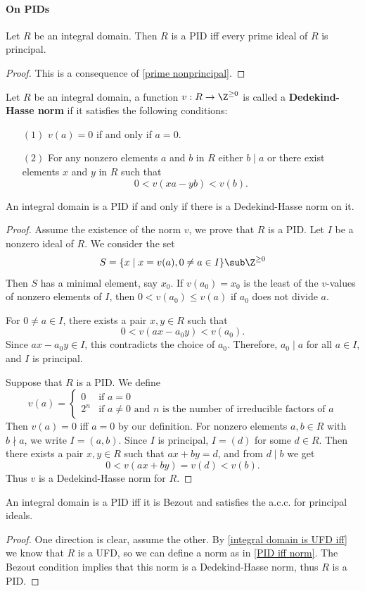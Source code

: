 \paragraph{On PIDs}
\begin{theorem}\label{PID iff prime principal}
Let $R$ be an integral domain. Then $R$ is a PID iff every prime ideal of $R$ is principal.
\end{theorem}
\begin{proof}
This is a consequence of \cref{prime nonprincipal}.
\end{proof}
\begin{definition}
Let $R$ be an integral domain, a function $v:R\to\Z^{\geq 0}$ is called a \textbf{Dedekind-Hasse norm} if it satisfies the following conditions:
\begin{itemize}
\item[$(1)$] $v(a)=0$ if and only if $a=0$.
\item[$(2)$] For any nonzero elements $a$ and $b$ in $R$ either $b\mid a$ or there exist elements $x$ and $y$ in $R$ such that 
\[0<v(xa-yb)<v(b).\] 
\end{itemize}
\end{definition}
\begin{proposition}\label{PID iff norm}
An integral domain is a PID if and only if there is a Dedekind-Hasse norm on it.
\end{proposition}
\begin{proof}
Assume the existence of the norm $v$, we prove that $R$ is a PID. Let $I$ be a nonzero ideal of $R$. We consider the set
\[S=\{x\mid x=v(a),0\neq a\in I\}\sub\Z^{\geq0}\]
Then $S$ has a minimal element, say $x_0$. If $v(a_0)=x_0$ is the least of the $v$-values of nonzero elements of $I$, then $0<v(a_0)\leq v(a)$ if $a_0$ does not divide $a$.\par
For $0\neq a\in I$, there exists a pair $x,y\in R$ such that
\[0<v(ax-a_0y)<v(a_0).\]
Since $ax-a_0y\in I$, this contradicts the choice of $a_0$. Therefore, $a_0\mid a$ for all $a\in I$, and $I$ is principal.\par
Suppose that $R$ is a PID. We define
\[v(a)=\begin{cases}
0&\text{if $a=0$}\\
2^n&\text{if $a\neq0$ and $n$ is the number of irreducible factors of $a$}
\end{cases}\]
Then $v(a)=0$ iff $a=0$ by our definition. For nonzero elements $a,b\in R$ with $b\nmid a$, we write $I=(a,b)$. Since $I$ is principal, $I=(d)$ for some $d\in R$. Then there exists a pair $x,y\in R$ such that $ax+by=d$, and from $d\mid b$ we get
\[0<v(ax+by)=v(d)<v(b).\]
Thus $v$ is a Dedekind-Hasse norm for $R$.
\end{proof}
\begin{proposition}
An integral domain is a PID iff it is Bezout and satisfies the a.c.c. for principal ideals.
\end{proposition}
\begin{proof}
One direction is clear, assume the other. By \cref{integral domain is UFD iff} we know that $R$ is a UFD, so we can define a norm as in \cref{PID iff norm}. The Bezout condition implies that this norm is a Dedekind-Hasse norm, thus $R$ is a PID.
\end{proof}
